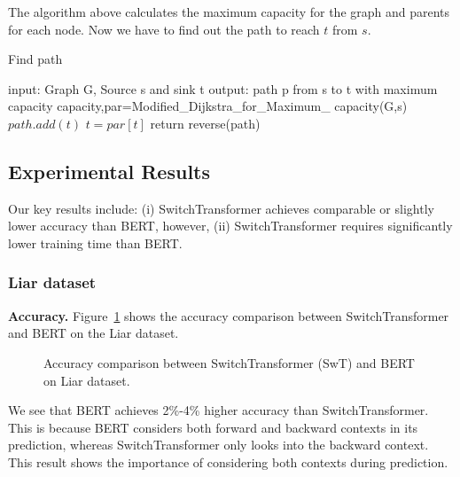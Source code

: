 The algorithm above calculates the maximum capacity for the graph and parents for each node. Now we have to find out the path to reach $t$ from $s$.


\begin{algorithm}
\caption{Find path}
\begin{algorithmic}[1]
\State input: Graph G, Source s and sink t
\State output: path p from s to t with maximum capacity
\State capacity,par=Modified\_Dijkstra\_for\_Maximum\_ capacity(G,s)
\State $path.add(t)$
\State $t=par[t]$
\EndWhile
\State return reverse(path)
\end{algorithmic}
\end{algorithm}

\subsection{Experimental Results}
\label{subsec:exp_results}
Our key results include: (i) SwitchTransformer achieves comparable or slightly lower accuracy than BERT, however, (ii) SwitchTransformer requires significantly lower training time than BERT.
\subsubsection{Liar dataset}
\noindent\textbf{Accuracy.}
Figure~\ref{fig:accuracy_comparison_liar} shows the accuracy comparison between SwitchTransformer and BERT on the Liar dataset.
\begin{figure}[h]
  \centering
 \hfill
  \caption{Accuracy comparison between SwitchTransformer (SwT) and BERT on Liar dataset.}
  \label{fig:accuracy_comparison_liar}
\end{figure}

We see that BERT achieves 2\%-4\% higher accuracy than SwitchTransformer. This is because BERT considers both forward and backward contexts in its prediction, whereas SwitchTransformer only looks into the backward context. This result shows the importance of considering both contexts during prediction.


